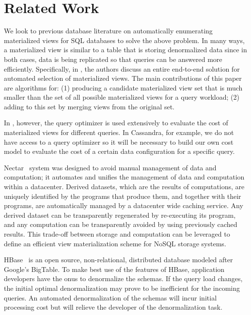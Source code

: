 \documentclass[10pt]{article}
\begin{document}
\section{Related Work}
We look to previous database literature on automatically enumerating materialized views for SQL databases to solve the above problem. 
In many ways, a materialized view is similar to a table that is storing denormalized data since in both cases, data is being replicated so 
that queries can be answered more efficiently. Specifically, in \cite{agrawal2000automated}, the authors discuss an entire end-to-end solution
for automated selection of materialized views. The main contributions of this paper are algorithms for: (1) producing a candidate materialized
view set that is much smaller than the set of all possible materialized views for a query workload; (2) adding to this set by merging views from 
the original set.

In \cite{agrawal2000automated}, however, the query optimizer is used extensively to evaluate the cost of materialized views for different queries.
In Cassandra, for example, we do not have access to a query optimizer so it will be necessary to build our own cost model to evaluate the cost
of a certain data configuration for a specific query. 

Nectar~\cite{gunda2010nectar} system was designed to avoid manual management of data and computation; it automates and unifies the management of
data and computation within a datacenter. Derived datasets, which are the results of computations, are uniquely identified by the programs that produce them,
and together with their programs, are automatically managed by a datacenter wide caching service. Any derived dataset can be transparently regenerated by re-executing
its program, and any computation can be transparently avoided by using previously cached results. This trade-off between storage and computation can
be leveraged to define an efficient view materialization scheme for NoSQL storage systems.

HBase~\cite{hbaseBook} is an open source, non-relational, distributed database modeled after Google's BigTable. To make best use of the features
of HBase, application developers have the onus to denormalize the schemas. If the query load changes, the initial optimal denormalization may
prove to be inefficient for the incoming queries. An automated denormalization of the schemas will incur initial processing cost but will relieve
the developer of the denormalization task.
\end{document}
